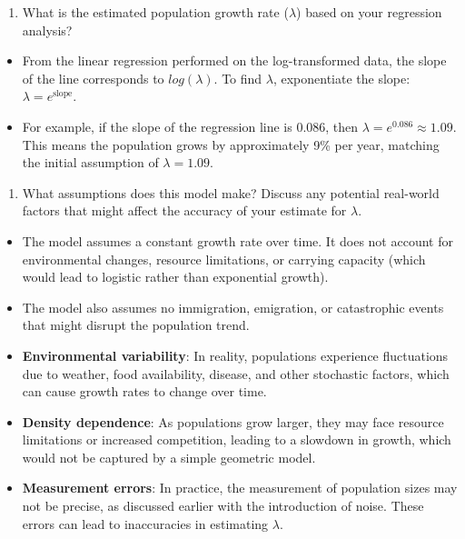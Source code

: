 \documentclass[
  a4paper]{book}
\providecommand{\tightlist}{%
  \setlength{\itemsep}{0pt}\setlength{\parskip}{0pt}}
\begin{document}
\begin{enumerate}
\def\labelenumi{\arabic{enumi}.}
\setcounter{enumi}{1}
\tightlist
\item
  What is the estimated population growth rate (\(\lambda\)) based on your regression analysis?
\end{enumerate}

\begin{itemize}
\tightlist
\item
  From the linear regression performed on the log-transformed data, the slope of the line corresponds to \(log(\lambda)\). To find \(\lambda\), exponentiate the slope: \(\lambda = e^{\text{slope}}\).
\item
  For example, if the slope of the regression line is 0.086, then \(\lambda = e^{0.086} \approx 1.09\). This means the population grows by approximately 9\% per year, matching the initial assumption of \(\lambda = 1.09\).
\end{itemize}

\begin{enumerate}
\def\labelenumi{\arabic{enumi}.}
\setcounter{enumi}{2}
\tightlist
\item
  What assumptions does this model make? Discuss any potential real-world factors that might affect the accuracy of your estimate for \(\lambda\).
\end{enumerate}

\begin{itemize}
\item
  The model assumes a constant growth rate over time. It does not account for environmental changes, resource limitations, or carrying capacity (which would lead to logistic rather than exponential growth).
\item
  The model also assumes no immigration, emigration, or catastrophic events that might disrupt the population trend.
\item
  \textbf{Environmental variability}: In reality, populations experience fluctuations due to weather, food availability, disease, and other stochastic factors, which can cause growth rates to change over time.
\item
  \textbf{Density dependence}: As populations grow larger, they may face resource limitations or increased competition, leading to a slowdown in growth, which would not be captured by a simple geometric model.
\item
  \textbf{Measurement errors}: In practice, the measurement of population sizes may not be precise, as discussed earlier with the introduction of noise. These errors can lead to inaccuracies in estimating \(\lambda\).
\end{itemize}
\end{document}
